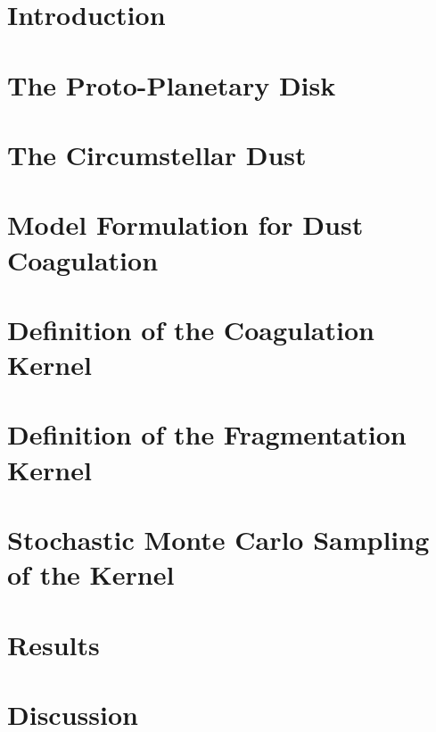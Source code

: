 \chapter{Introduction}
    \label{ch:introduction}
    
\chapter{The Proto-Planetary Disk}
    \label{ch:disk}
    
\chapter{The Circumstellar Dust}
    \label{ch:dust}
    
\chapter{Model Formulation for Dust Coagulation}
    \label{ch:smoluchoswki}
    
\chapter{Definition of the Coagulation Kernel}
    \label{ch:coagulation}
    
\chapter{Definition of the Fragmentation Kernel}
    \label{ch:fragmentation}
    
\chapter{Stochastic Monte Carlo Sampling of the Kernel}
    \label{ch:sampling}
    
\chapter{Results}
    \label{ch:results}
    
\chapter{Discussion}
    \label{ch:discussion}
    
